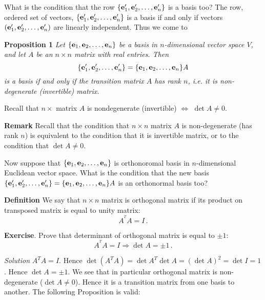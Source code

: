 \documentclass[12pt]{article}
\numberwithin{equation}{section}
\begin{document}
 What is the condition that  the row $\{{\bf e}'_1,{\bf e}'_2,\dots,{\bf e}'_n\}$ 
is a basis too?
 The row, ordered set of vectors,
 $\{{\bf e}'_1,{\bf e}'_2,\dots,{\bf e}'_n\}$ is a basis if and only if vectors $({\bf e}'_1,{\bf e}'_2,\dots,{\bf e}'_n)$
are  linearly independent. Thus  we come to

{\bf Proposition 1} {\it Let $\{{\bf e}_1,{\bf e}_2,\dots,{\bf e}_n\}$ be a basis in 
$n$-dimensional
 vector space $V$, and let $A$ be an
$n\times n$ matrix with real entries.
Then
                      \begin{equation}\label{transitionmatrix}
                      \{{\bf e}'_1,{\bf e}'_2,\dots,{\bf e}'_n\}=\{{\bf e}_1,{\bf e}_2,\dots,{\bf e}_n\}A
                       \end{equation}
                       is a basis if and only if the transition
matrix $A$ has rank $n$, i.e. it is non-degenerate (invertible) matrix.}

Recall that $n\times$ matrix $A$ is nondegenerate (invertible)
$\Leftrightarrow$ $\det A\not=0$.



\m

{\bf Remark}  Recall that  the condition that $n\times n$ matrix $A$ is non-degenerate
(has rank $n$) is equivalent to the condition that it is invertible matrix,
or to the condition that $\det A\not=0$.

Now suppose that  $\{{\bf e}_1,{\bf e}_2,\dots,{\bf e}_n\}$ is orthonoromal basis 
in $n$-dimensional Euclidean
vector space.   What is the condition that  the new basis
$\{{\bf e}'_1,{\bf e}'_2,\dots,{\bf e}'_n\}=\{{\bf e}_1,{\bf e}_2,\dots,{\bf e}_n\}A$ is 
an orthonormal  basis too?

\m

{\bf Definition}  We say that $n\times n$ matrix is orthogonal matrix 
if its product on transposed matrix is equal to unity matrix:
                \begin{equation}\label{defofofthogonal}
                    A^{^T}A=I\,.
                \end{equation}

 {\bf Exercise}. Prove that determinant of orthogonal matrix is 
equal to $\pm 1$:
 \begin{equation}\label{defofofthogonal2}
                    A^{^T}A=I\Rightarrow \det A=\pm 1\,.
                \end{equation}

 {\sl Solution}  $A^TA=I$. Hence $\det (A^TA)=\det A^T\det A=(\det A)^2=\det I=1$. Hence $\det A=\pm 1$.
   We see that in particular orthogonal matrix is non-degenerate ($\det A\not=0$). Hence it is a transition matrix from one basis to another.      The following  Proposition is valid:
\end{document}
